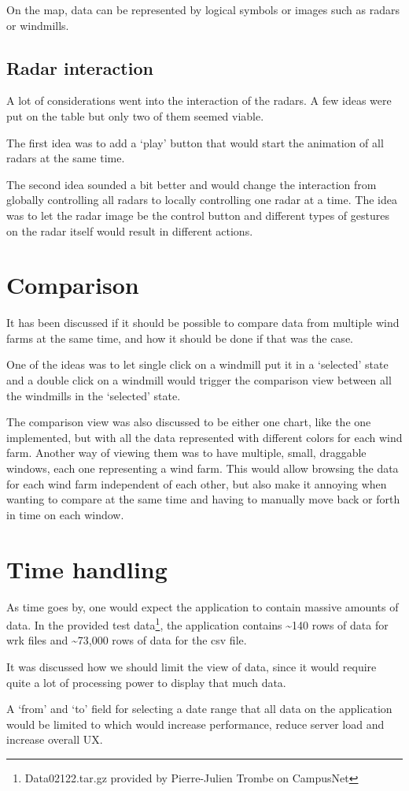 On the map, data can be represented by logical symbols or images such as radars or windmills.

\subsection{Radar interaction}
\label{sec:radar_interaction}
A lot of considerations went into the interaction of the radars. A few ideas were put on the table but only two of them seemed viable.

The first idea was to add a `play' button that would start the animation of all radars at the same time.

The second idea sounded a bit better and would change the interaction from globally controlling all radars to locally controlling one radar at a time. The idea was to let the radar image be the control button and different types of gestures on the radar itself would result in different actions.

\section{Comparison}
\label{sec:comparison}
It has been discussed if it should be possible to compare data from multiple wind farms at the same time, and how it should be done if that was the case.

One of the ideas was to let single click on a windmill put it in a `selected' state and a double click on a windmill would trigger the comparison view between all the windmills in the `selected' state.

The comparison view was also discussed to be either one chart, like the one implemented, but with all the data represented with different colors for each wind farm.
Another way of viewing them was to have multiple, small, draggable windows, each one representing a wind farm. This would allow browsing the data for each wind farm independent of each other, but also make it annoying when wanting to compare at the same time and having to manually move back or forth in time on each window.

\section{Time handling}
\label{sec:time_handling}
As time goes by, one would expect the application to contain massive amounts of data.
In the provided test data\footnote{Data02122.tar.gz provided by Pierre-Julien Trombe on CampusNet}, the application contains \textasciitilde 140 rows of data for \textsf{wrk} files and \textasciitilde 73,000 rows of data for the \textsf{csv} file.

It was discussed how we should limit the view of data, since it would require quite a lot of processing power to display that much data.

A `from' and `to' field for selecting a date range that all data on the application would be limited to which would increase performance, reduce server load and increase overall UX.